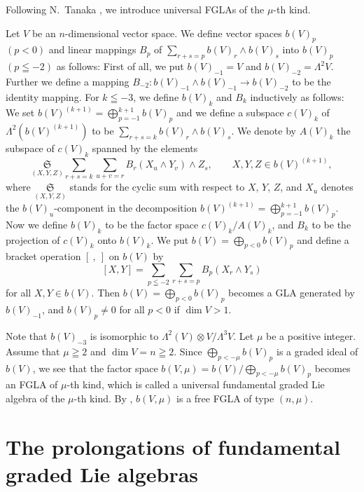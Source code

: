 \documentclass[pdftex]{sigma}
\numberwithin{equation}{section}
\numberwithin{theorem}{section}
\numberwithin{proposition}{section}
\numberwithin{lemma}{section}
\numberwithin{corollary}{section}
\numberwithin{definition}{section}
\numberwithin{example}{section}
\numberwithin{remark}{section}
\numberwithin{note}{section}
\begin{document}
Following N.~Tanaka \cite{tan70:1}, we introduce universal FGLAs of the
$\mu$-th kind.

Let $V$ be an $n$-dimensional vector space.
We def\/ine vector spaces $b(V)_p$ $(p<0)$ and li\-near mappings $B_p$ of
$\sum\limits_{r+s=p}b(V)_r\wedge b(V)_s$ into $b(V)_p$ $(p\leqq -2)$
as follows:
First of all, we put \mbox{$b(V)_{-1}=V$} and $b(V)_{-2}=\Lambda^2V$. Further
we def\/ine a mapping $B_{-2}:b(V)_{-1}\wedge b(V)_{-1}\to b(V)_{-2}$
to be the identity mapping. For $k\leqq-3$, we def\/ine $b(V)_k$ and
$B_k$ inductively as follows:
We set $b(V)^{(k+1)}=\bigoplus\limits_{p=-1}^{k+1}b(V)_p$ and
we def\/ine a subspace $c(V)_k$ of $\Lambda^2(b(V)^{(k+1)})$ to be
$\sum\limits_{r+s=k}b(V)_r\wedge b(V)_s$.
We denote by $A(V)_k$ the subspace of $c(V)_k$ spanned by the elements
\[
\underset{(X,Y,Z)}{\mathfrak S}\sum_{r+s=k}\sum_{u+v=r}B_r(X_u\wedge Y_v)\wedge Z_s,
\qquad  X,Y,Z\in b(V)^{(k+1)} ,
\]
where $\underset{(X,Y,Z)}{\mathfrak S}$ stands for the cyclic sum with respect to $X$, $Y$, $Z$, and $X_u$ denotes the $b(V)_u$-component in the decomposition
$b(V)^{(k+1)}=\bigoplus\limits_{p=-1}^{k+1}b(V)_p$.
Now we def\/ine $b(V)_k$ to be the factor space $c(V)_k/A(V)_k$, and
$B_k$ to be the projection of $c(V)_k$ onto $b(V)_k$.
We put $b(V)=\bigoplus\limits_{p<0}b(V)_p$ and def\/ine a bracket operation
$[\ , \ ]$ on $b(V)$ by
\[
[X,Y]=\sum_{p\leqq-2}\sum_{r+s=p}B_p(X_r\wedge Y_s)
\]
for all $X,Y\in b(V)$. Then $b(V)=\bigoplus\limits_{p<0}b(V)_p$ becomes a GLA generated by $b(V)_{-1}$, and $b(V)_p\ne0$ for all $p<0$ if $\dim V>1$.

Note that $b(V)_{-3}$ is isomorphic to $\Lambda^2(V)\otimes V/\Lambda^3V$.
Let $\mu$ be a positive integer. Assume that $\mu\geqq 2$ and $\dim V=n\geqq 2$.
Since $\bigoplus\limits_{p<-\mu}b(V)_p$ is a graded ideal of $b(V)$,
we see that the factor space $b(V,\mu)=b(V)/\bigoplus\limits_{p<-\mu}b(V)_p$
becomes an FGLA of $\mu$-th kind,
which is called a universal fundamental graded Lie algebra of the
$\mu$-th kind.
By \cite[Proposition~3.2]{tan70:1},
$b(V,\mu)$ is a free FGLA of type $(n,\mu)$.

\section{The prolongations of fundamental graded Lie algebras}\label{section4}
\end{document}
